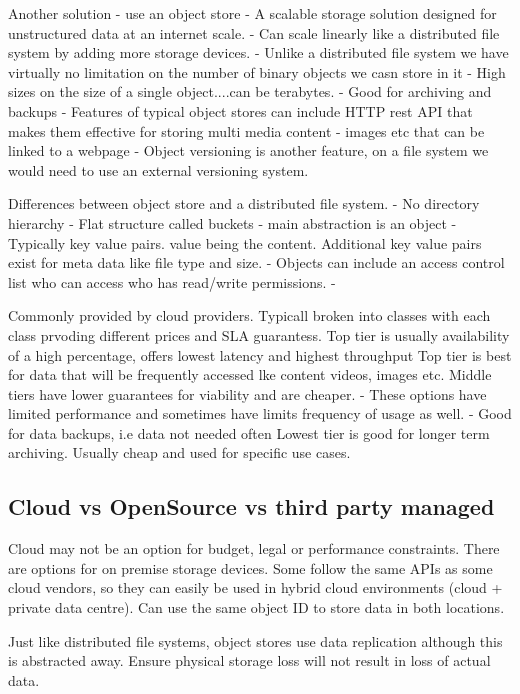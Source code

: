 \documentclass[a4paper, 11pt]{book}
\begin{document}
    Another solution - use an object store
    - A scalable storage solution designed for unstructured data at an internet scale.
    - Can scale linearly like a distributed file system by adding more storage devices.
    - Unlike a distributed file system we have virtually no limitation on the number of binary objects we casn store in it
    - High sizes on the size of a single object....can be terabytes.
    - Good for archiving and backups
    - Features of typical object stores can include HTTP rest API that makes them effective for storing multi media content - images etc that can be linked to a webpage
    - Object versioning is another feature, on a file system we would need to use an external versioning system.

    Differences between object store and a distributed file system.
    - No directory hierarchy
    - Flat structure called buckets
    - main abstraction is an object
    - Typically key value pairs. value being the content. Additional key value pairs exist for meta data like file type and size.
    - Objects can include an access control list who can access who has read/write permissions.
    -

    Commonly provided by cloud providers.
    Typicall broken into classes with each class prvoding different prices and SLA guarantess.
    Top tier is usually availability of a high percentage, offers lowest latency and highest throughput
    Top tier is best for data that will be frequently accessed lke content videos, images etc.
    Middle tiers have lower guarantees for viability and are cheaper.
    - These options have limited performance and sometimes have limits frequency of usage as well.
    - Good for data backups, i.e data not needed often
    Lowest tier is good for longer term archiving.
    Usually cheap and used for specific use cases.

    \subsection{Cloud vs OpenSource vs third party managed}
    Cloud may not be an option for budget, legal or performance constraints.
    There are options for on premise storage devices.
    Some follow the same APIs as some cloud vendors, so they can easily be used in hybrid cloud environments (cloud + private data centre).
    Can use the same object ID to store data in both locations.

    Just like distributed file systems, object stores use data replication although this is abstracted away.
    Ensure physical storage loss will not result in loss of actual data.
\end{document}
